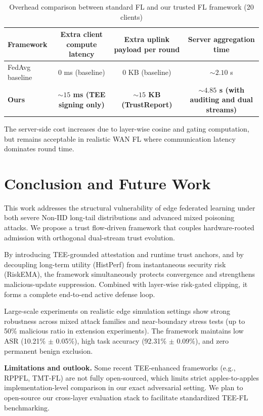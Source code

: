 \documentclass[runningheads]{llncs}
\begin{document}
\begin{table}[htbp]
\centering
\caption{Overhead comparison between standard FL and our trusted FL framework (20 clients)}
\vspace{4pt}
\label{tab:overhead}
\begin{tabular}{l c c c}
\toprule
\textbf{Framework} & \textbf{Extra client compute latency} & \textbf{Extra uplink payload per round} & \textbf{Server aggregation time} \\
\midrule
FedAvg baseline & 0 ms (baseline) & 0 KB (baseline) & $\sim 2.10$ s \\
\textbf{Ours} & \textbf{$\sim 15$ ms (TEE signing only)} & \textbf{$\sim 15$ KB (TrustReport)} & \textbf{$\sim 4.85$ s (with auditing and dual streams)} \\
\bottomrule
\end{tabular}
\end{table}

The server-side cost increases due to layer-wise cosine and gating computation, but remains acceptable in realistic WAN FL where communication latency dominates round time.

\section{Conclusion and Future Work}
This work addresses the structural vulnerability of edge federated learning under both severe Non-IID long-tail distributions and advanced mixed poisoning attacks. We propose a trust flow-driven framework that couples hardware-rooted admission with orthogonal dual-stream trust evolution.

By introducing TEE-grounded attestation and runtime trust anchors, and by decoupling long-term utility (HistPerf) from instantaneous security risk (RiskEMA), the framework simultaneously protects convergence and strengthens malicious-update suppression. Combined with layer-wise risk-gated clipping, it forms a complete end-to-end active defense loop.

Large-scale experiments on realistic edge simulation settings show strong robustness across mixed attack families and near-boundary stress tests (up to 50\% malicious ratio in extension experiments). The framework maintains low ASR (10.21\% $\pm$ 0.05\%), high task accuracy (92.31\% $\pm$ 0.09\%), and zero permanent benign exclusion.

\textbf{Limitations and outlook.} Some recent TEE-enhanced frameworks (e.g., RPPFL\cite{zhang2025rppfl}, TMT-FL\cite{lu2025tmt}) are not fully open-sourced, which limits strict apples-to-apples implementation-level comparison in our exact adversarial setting. We plan to open-source our cross-layer evaluation stack to facilitate standardized TEE-FL benchmarking.
\end{document}
